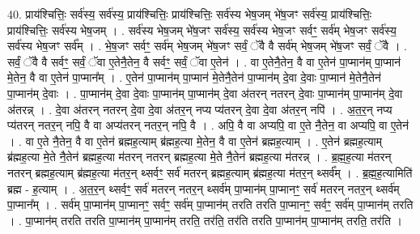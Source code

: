 \documentclass[17pt]{extarticle}
\begin{document}
40. प्राय॑श्चित्तिः॒ सर्व॑स्य॒ सर्व॑स्य॒ प्राय॑श्चित्तिः॒ प्राय॑श्चित्तिः॒ सर्व॑स्य भेष॒जम् भे॑ष॒जꣳ सर्व॑स्य॒ प्राय॑श्चित्तिः॒ प्राय॑श्चित्तिः॒ सर्व॑स्य भेष॒जम् । . सर्व॑स्य भेष॒जम् भे॑ष॒जꣳ सर्व॑स्य॒ सर्व॑स्य भेष॒जꣳ सर्वꣳ॒॒ सर्व॑म् भेष॒जꣳ सर्व॑स्य॒ सर्व॑स्य भेष॒जꣳ सर्व᳚म् । . भे॒ष॒जꣳ सर्वꣳ॒॒ सर्व॑म् भेष॒जम् भे॑ष॒जꣳ सर्वं॒ ॅवै वै सर्व॑म् भेष॒जम् भे॑ष॒जꣳ सर्वं॒ ॅवै । . सर्वं॒ ॅवै वै सर्वꣳ॒॒ सर्वं॒ ॅवा ए॒तेनै॒तेन॒ वै सर्वꣳ॒॒ सर्वं॒ ॅवा ए॒तेन॑ । . वा ए॒तेनै॒तेन॒ वै वा ए॒तेन॑ पा॒प्मान॑म् पा॒प्मान॑ मे॒तेन॒ वै वा ए॒तेन॑ पा॒प्मान᳚म् । . ए॒तेन॑ पा॒प्मान॑म् पा॒प्मान॑ मे॒तेनै॒तेन॑ पा॒प्मान॑म् दे॒वा दे॒वाः पा॒प्मान॑ मे॒तेनै॒तेन॑ पा॒प्मान॑म् दे॒वाः । . पा॒प्मान॑म् दे॒वा दे॒वाः पा॒प्मान॑म् पा॒प्मान॑म् दे॒वा अ॑तरन् नतरन् दे॒वाः पा॒प्मान॑म् पा॒प्मान॑म् दे॒वा अ॑तरन्न् । . दे॒वा अ॑तरन् नतरन् दे॒वा दे॒वा अ॑तर॒न् नप्य प्य॑तरन् दे॒वा दे॒वा अ॑तर॒न् नपि॑ । . अ॒त॒र॒न् नप्य प्य॑तरन् नतर॒न् नपि॒ वै वा अप्य॑तरन् नतर॒न् नपि॒ वै । . अपि॒ वै वा अप्यपि॒ वा ए॒ते नै॒तेन॒ वा अप्यपि॒ वा ए॒तेन॑ । . वा ए॒ते नै॒तेन॒ वै वा ए॒तेन॑ ब्रह्मह॒त्याम् ब्र॑ह्मह॒त्या मे॒तेन॒ वै वा ए॒तेन॑ ब्रह्मह॒त्याम् । . ए॒तेन॑ ब्रह्मह॒त्याम् ब्र॑ह्मह॒त्या मे॒ते नै॒तेन॑ ब्रह्मह॒त्या म॑तरन् नतरन् ब्रह्मह॒त्या मे॒ते नै॒तेन॑ ब्रह्मह॒त्या म॑तरन्न् । . ब्र॒ह्म॒ह॒त्या म॑तरन् नतरन् ब्रह्मह॒त्याम् ब्र॑ह्मह॒त्या म॑तर॒न् थ्सर्वꣳ॒॒ सर्व॑ मतरन् ब्रह्मह॒त्याम् ब्र॑ह्मह॒त्या म॑तर॒न् थ्सर्व᳚म् । . ब्र॒ह्म॒ह॒त्यामिति॑ ब्रह्म - ह॒त्याम् । . अ॒त॒र॒न् थ्सर्वꣳ॒॒ सर्व॑ मतरन् नतर॒न् थ्सर्व॑म् पा॒प्मान॑म् पा॒प्मानꣳ॒॒ सर्व॑ मतरन् नतर॒न् थ्सर्व॑म् पा॒प्मान᳚म् । . सर्व॑म् पा॒प्मान॑म् पा॒प्मानꣳ॒॒ सर्वꣳ॒॒ सर्व॑म् पा॒प्मान॑म् तरति तरति पा॒प्मानꣳ॒॒ सर्वꣳ॒॒ सर्व॑म् पा॒प्मान॑म् तरति । . पा॒प्मान॑म् तरति तरति पा॒प्मान॑म् पा॒प्मान॑म् तरति॒ तर॑ति॒ तर॑ति तरति पा॒प्मान॑म् पा॒प्मान॑म् तरति॒ तर॑ति । \newline
\pagebreak
{}
\end{document}
